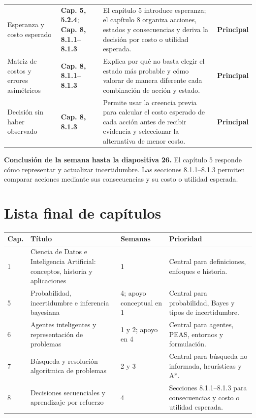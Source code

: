 \documentclass[10pt,a4paper]{article}
\newcommand{\capitulo}[1]{\textbf{\color{UAPTeal}#1}}
\newcommand{\principal}{\textbf{Principal}}
\begin{document}
\begin{longtable}{P{3.35cm}P{4.05cm}P{6.25cm}P{2.15cm}}
Esperanza y costo esperado & \capitulo{Cap. 5, 5.2.4}; \capitulo{Cap. 8, 8.1.1--8.1.3} & El capítulo 5 introduce esperanza; el capítulo 8 organiza acciones, estados y consecuencias y deriva la decisión por costo o utilidad esperada. & \principal \\
Matriz de costos y errores asimétricos & \capitulo{Cap. 8, 8.1.1--8.1.3} & Explica por qué no basta elegir el estado más probable y cómo valorar de manera diferente cada combinación de acción y estado. & \principal \\
Decisión sin haber observado & \capitulo{Cap. 8, 8.1.3} & Permite usar la creencia previa para calcular el costo esperado de cada acción antes de recibir evidencia y seleccionar la alternativa de menor costo. & \principal \\
\bottomrule
\end{longtable}

\textbf{Conclusión de la semana hasta la diapositiva 26.} El capítulo 5 responde cómo representar y actualizar incertidumbre. Las secciones 8.1.1--8.1.3 permiten comparar acciones mediante sus consecuencias y su costo o utilidad esperada.

\newpage
\section*{Lista final de capítulos}

\begin{longtable}{P{1.2cm}P{6.1cm}P{4.1cm}P{4.3cm}}
\toprule
{}
\color{white}\textbf{Cap.} & \color{white}\textbf{Título} & \color{white}\textbf{Semanas} & \color{white}\textbf{Prioridad} \\
 & Ciencia de Datos e Inteligencia Artificial: conceptos, historia y aplicaciones & 1 & Central para definiciones, enfoques e historia. \\
5 & Probabilidad, incertidumbre e inferencia bayesiana & 4; apoyo conceptual en 1 & Central para probabilidad, Bayes y tipos de incertidumbre. \\
6 & Agentes inteligentes y representación de problemas & 1 y 2; apoyo en 4 & Central para agentes, PEAS, entornos y formulación. \\
7 & Búsqueda y resolución algorítmica de problemas & 2 y 3 & Central para búsqueda no informada, heurísticas y A*. \\
8 & Decisiones secuenciales y aprendizaje por refuerzo & 4 & Secciones 8.1.1--8.1.3 para consecuencias y costo o utilidad esperada. \\
\bottomrule
\end{longtable}
\end{document}
